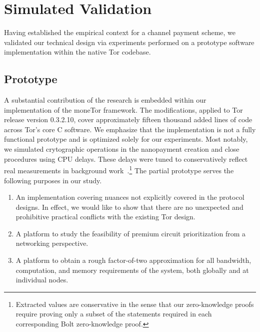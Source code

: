 
\section{Simulated Validation}
\label{sec:experimentations}

Having established the empirical context for a channel payment scheme, we
validated our technical design via experiments performed on a prototype
software implementation within the native Tor codebase.

\subsection{Prototype}

A substantial contribution of the research is embedded within our implementation
of the moneTor framework. The modifications, applied to Tor release version
0.3.2.10, cover approximately fifteen thousand added lines of code across Tor's
core C software. We emphasize that the implementation is not a fully functional
prototype and is optimized solely for our experiments. Most notably, we
simulated crytographic operations in the nanopayment creation and close
procedures using CPU delays. These delays were tuned to conservatively reflect
real measurements in background work~\cite{green2017bolt}.\footnote{Extracted
  values are conservative in the sense that our zero-knowledge proofs require
  proving only a subset of the statements required in each corresponding Bolt
  zero-knowledge proof.} The partial prototype serves the following purposes in
our study.

\begin{enumerate}
\item An implementation covering nuances not explicitly
  covered in the protocol designs. In effect, we would like to show that there
  are no unexpected and prohibitive practical conflicts with the existing Tor
  design.
\item A platform to study the feasibility of premium circuit
  prioritization from a networking perspective.
\item A platform to obtain a rough factor-of-two approximation for all
  bandwidth, computation, and memory requirements of the system, both globally
  and at individual nodes.
\end{enumerate}

